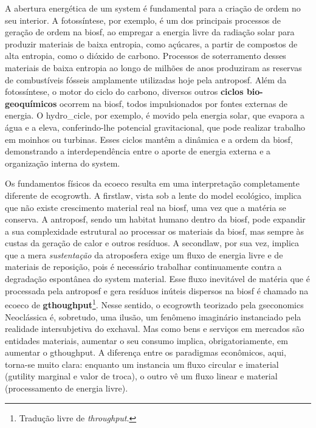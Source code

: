 \documentclass[./main.tex]{subfiles}
\begin{document}
\par A abertura energética de um \gls{system} é fundamental para a criação de ordem no seu interior. A fotossíntese, por exemplo, é um dos principais processos de geração de ordem na \gls{biosf}, ao empregar a energia livre da radiação solar para produzir materiais de baixa entropia, como açúcares, a partir de compostos de alta entropia, como o dióxido de carbono. Processos de soterramento desses materiais de baixa entropia ao longo de milhões de anos produziram as reservas de combustíveis fósseis amplamente utilizadas hoje pela \gls{antroposf}. Além da fotossíntese, o motor do ciclo do carbono, diversos outros \textbf{ciclos bio-geoquímicos} ocorrem na \gls{biosf}, todos impulsionados por fontes externas de energia. O \gls{hydro_cicle}, por exemplo, é movido pela energia solar, que evapora a água e a eleva, conferindo-lhe potencial gravitacional, que pode realizar trabalho em moinhos ou turbinas. Esses ciclos mantêm a dinâmica e a ordem da \gls{biosf}, demonstrando a interdependência entre o aporte de energia externa e a organização interna do \gls{system}.

\par Os fundamentos físicos da \gls{ecoeco} resulta em uma interpretação completamente diferente de \gls{ecogrowth}. A \gls{firstlaw}, vista sob a lente do \gls{model} ecológico, implica que não existe crescimento material real na \gls{biosf}, uma vez que a matéria se conserva. A \gls{antroposf}, sendo um habitat humano dentro da \gls{biosf}, pode expandir a sua complexidade estrutural ao processar os materiais da \gls{biosf}, mas sempre às custas da geração de calor e outros resíduos. A \gls{secondlaw}, por sua vez, implica que a mera \textit{sustentação} da atroposfera exige um fluxo de energia livre e de materiais de reposição, pois é necessário trabalhar continuamente contra a degradação espontânea do \gls{system} material. Esse fluxo inevitável de matéria que é processada pela \gls{antroposf} e gera resíduos inúteis dispersos na \gls{biosf} é chamado na \gls{ecoeco} de \textbf{\gls{gthoughput}}\footnote{Tradução livre de \textit{throughput}.}. Nesse sentido, o \gls{ecogrowth} teorizado pela \gls{gseconomics} Neoclássica é, sobretudo, uma ilusão, um fenômeno imaginário instanciado pela realidade intersubjetiva do \gls{exchaval}. Mas como bens e serviços em mercados são entidades materiais, aumentar o seu consumo implica, obrigatoriamente, em aumentar o \gls{gthoughput}. A diferença entre os paradigmas econômicos, aqui, torna-se muito clara: enquanto um instancia um fluxo circular e imaterial (\gls{gutility} marginal e valor de troca), o outro vê um fluxo linear e material (processamento de energia livre).
\end{document}
